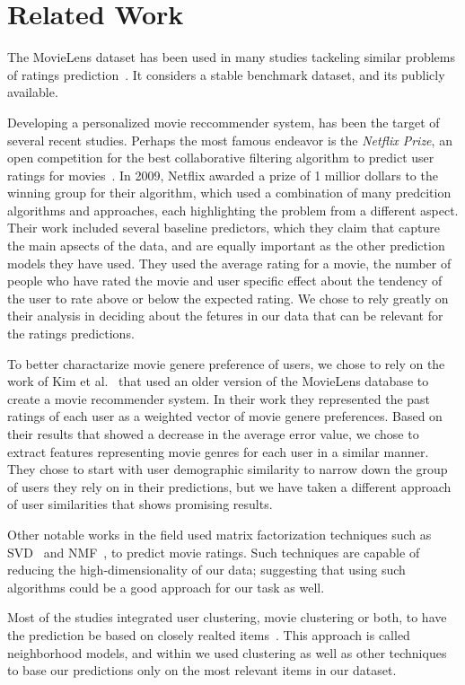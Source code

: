 \section{Related Work}

The MovieLens dataset has been used in many studies tackeling similar problems of ratings prediction~\cite{5575081, zhang2006learning}. It considers a stable benchmark dataset, and its publicly available. 

Developing a personalized movie reccommender system, has been the target of several recent studies. Perhaps the most famous endeavor is the \textit{Netflix Prize}, an open competition for the best collaborative filtering algorithm to predict user ratings for movies~\cite{bell2007bellkor}. In 2009, Netflix awarded a prize of 1 millior dollars to the winning group for their algorithm, which used a combination of many predcition algorithms and approaches, each highlighting the problem from a different aspect. Their work included several baseline predictors, which they claim that capture the main apsects of the data, and are equally important as the other prediction models they have used. They used the average rating for a movie, the number of people who have rated the movie and user specific effect about the tendency of the user to rate above or below the expected rating. We chose to rely greatly on their analysis in deciding about the fetures in our data that can be relevant for the ratings predictions. 

To better charactarize movie genere preference of users, we chose to rely on the work of Kim et al.~\cite{5575081} that used an older version of the MovieLens database to create a movie recommender system. In their work they represented the past ratings of each user as a weighted vector of movie genere preferences. Based on their results that showed a decrease in the average error value, we chose to extract features representing movie genres for each user in a similar manner. They chose to start with user demographic similarity to narrow down the group of users they rely on in their predictions, but we have taken a different approach of user similarities that shows promising results. 

Other notable works in the field used matrix factorization techniques such as SVD~\cite{koren2009matrix, zhang2006learning} and NMF~\cite{nguyen2012modified, zhang2006learning}, to predict movie ratings. Such techniques are capable of reducing the high-dimensionality of our data; suggesting that using such algorithms could be a good approach for our task as well. 

Most of the studies integrated user clustering, movie clustering or both, to have the prediction be based on closely realted items~\cite{bell2007bellkor, 5575081, kim2012recommender}. This approach is called neighborhood models, and within we used clustering as well as other techniques to base our predictions only on the most relevant items in our dataset.